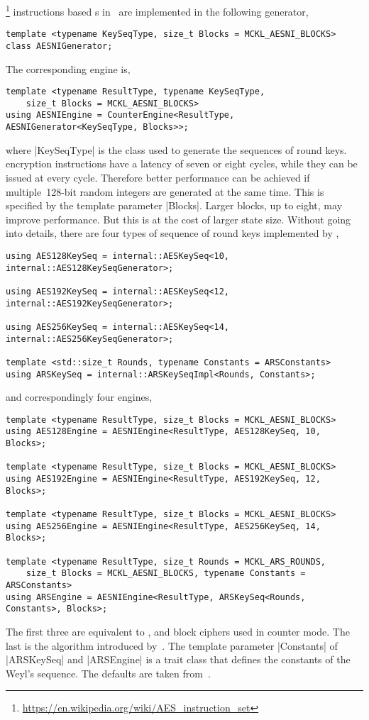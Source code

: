 \aesni\footnote{\url{https://en.wikipedia.org/wiki/AES_instruction_set}}
instructions based \rng{}s in~\cite{Salmon:2011um} are implemented in the
following generator,
\begin{verbatim}
template <typename KeySeqType, size_t Blocks = MCKL_AESNI_BLOCKS>
class AESNIGenerator;
\end{verbatim}
The corresponding \rng engine is,
\begin{verbatim}
template <typename ResultType, typename KeySeqType,
    size_t Blocks = MCKL_AESNI_BLOCKS>
using AESNIEngine = CounterEngine<ResultType, AESNIGenerator<KeySeqType, Blocks>>;
\end{verbatim}
where |KeySeqType| is the class used to generate the sequences of round keys.
\aesni encryption instructions have a latency of seven or eight cycles, while
they can be issued at every cycle. Therefore better performance can be achieved
if multiple~128-bit random integers are generated at the same time. This is
specified by the template parameter |Blocks|. Larger blocks, up to eight, may
improve performance. But this is at the cost of larger state size. Without
going into details, there are four types of sequence of round keys implemented
by \mckl,
\begin{verbatim}
using AES128KeySeq = internal::AESKeySeq<10, internal::AES128KeySeqGenerator>;

using AES192KeySeq = internal::AESKeySeq<12, internal::AES192KeySeqGenerator>;

using AES256KeySeq = internal::AESKeySeq<14, internal::AES256KeySeqGenerator>;

template <std::size_t Rounds, typename Constants = ARSConstants>
using ARSKeySeq = internal::ARSKeySeqImpl<Rounds, Constants>;
\end{verbatim}
and correspondingly four \rng engines,
\begin{verbatim}
template <typename ResultType, size_t Blocks = MCKL_AESNI_BLOCKS>
using AES128Engine = AESNIEngine<ResultType, AES128KeySeq, 10, Blocks>;

template <typename ResultType, size_t Blocks = MCKL_AESNI_BLOCKS>
using AES192Engine = AESNIEngine<ResultType, AES192KeySeq, 12, Blocks>;

template <typename ResultType, size_t Blocks = MCKL_AESNI_BLOCKS>
using AES256Engine = AESNIEngine<ResultType, AES256KeySeq, 14, Blocks>;

template <typename ResultType, size_t Rounds = MCKL_ARS_ROUNDS,
    size_t Blocks = MCKL_AESNI_BLOCKS, typename Constants = ARSConstants>
using ARSEngine = AESNIEngine<ResultType, ARSKeySeq<Rounds, Constants>, Blocks>;
\end{verbatim}
The first three are equivalent to ,  and  block ciphers
used in counter mode. The last is the \ars algorithm introduced
by~\cite{Salmon:2011um}. The template parameter |Constants| of |ARSKeySeq| and
|ARSEngine| is a trait class that defines the constants of the Weyl's sequence.
The defaults are taken from~\cite{Salmon:2011um}.

